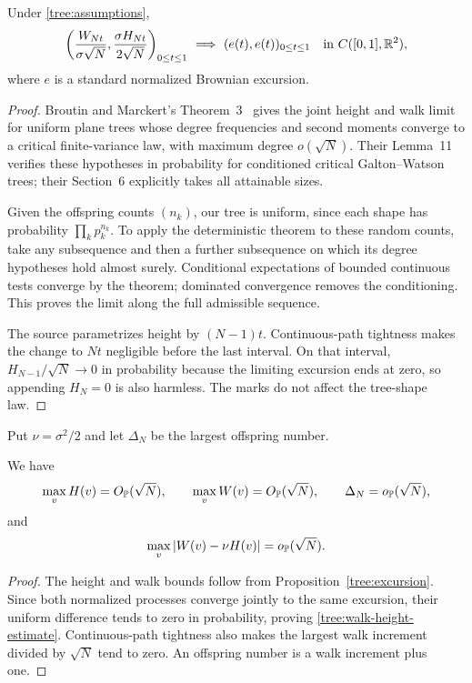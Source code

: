 \begin{proposition}
\label{tree:excursion}
Under \eqref{tree:assumptions},
\begin{equation}
 \left(\frac{W_{Nt}}{\sigma\sqrt N},
       \frac{\sigma H_{Nt}}{2\sqrt N}\right)_{0\leq t\leq1}
 \ \Longrightarrow\ (e(t),e(t))_{0\leq t\leq1}
 \quad\hbox{in }C([0,1],\R^2),
 \label{tree:walk-limit}
\end{equation}
where $e$ is a standard normalized Brownian excursion.
\end{proposition}
\begin{proof}
Broutin and Marckert's Theorem~3~\cite{BroutinMarckert2014} gives the
joint height and walk limit for uniform plane trees whose degree
frequencies and second moments converge to a critical finite-variance
law, with maximum degree $o(\sqrt N)$.  Their Lemma~11 verifies these
hypotheses in probability for conditioned critical Galton--Watson trees;
their Section~6 explicitly takes all attainable sizes.

Given the offspring counts $(n_k)$, our tree is uniform, since each
shape has probability $\prod_kp_k^{n_k}$.  To apply the deterministic
theorem to these random counts, take any subsequence and then a further
subsequence on which its degree hypotheses hold almost surely.
Conditional expectations of bounded continuous tests converge by the
theorem; dominated convergence removes the conditioning.  This proves
the limit along the full admissible sequence.

The source parametrizes height by $(N-1)t$.  Continuous-path tightness
makes the change to $Nt$ negligible before the last interval.  On that
interval, $H_{N-1}/\sqrt N\to0$ in probability because the limiting
excursion ends at zero, so appending $H_N=0$ is also harmless.  The marks
do not affect the tree-shape law.
\end{proof}

Put $\nu=\sigma^2/2$ and let $\Delta_N$ be the largest offspring number.

\begin{corollary}
\label{tree:maxdegree}
We have
\begin{equation}
 \max_v H(v)=O_{\P}(\sqrt N),\qquad
 \max_v W(v)=O_{\P}(\sqrt N),\qquad
 \Delta_N=o_{\P}(\sqrt N),
 \label{tree:degree-bound}
\end{equation}
and
\begin{equation}
 \max_v|W(v)-\nu H(v)|=o_{\P}(\sqrt N).
 \label{tree:walk-height-estimate}
\end{equation}
\end{corollary}
\begin{proof}
The height and walk bounds follow from Proposition~\ref{tree:excursion}.
Since both normalized processes converge jointly to the same excursion,
their uniform difference tends to zero in probability, proving
\eqref{tree:walk-height-estimate}.  Continuous-path tightness also makes
the largest walk increment divided by $\sqrt N$ tend to zero.  An
offspring number is a walk increment plus one.
\end{proof}

